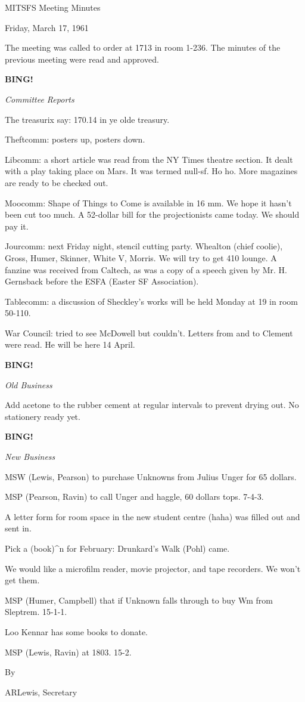 \documentclass[12pt]{article}
\newcommand{\bing}{{\bf BING!} }
\newcommand{\goto}[1]{\bing \vskip 12pt \centerline{{\em{#1}}}}
\begin{document}
\begin{center}

MITSFS Meeting Minutes

Friday, March 17, 1961

\end{center}
 
\vspace{12pt}

\setlength{\parskip}{6pt}

\noindent
The meeting was called to order at 1713 in room 1-236. The minutes of the previous meeting were read and approved.

\goto{Committee Reports}

The treasurix say: 170.14 in ye olde treasury.

Theftcomm: posters up, posters down.

Libcomm: a short article was read from the NY Times theatre section. It dealt with a play taking place on Mars. It was termed null-sf. Ho ho. More magazines are ready to be checked out.

Moocomm: Shape of Things to Come is available in 16 mm. We hope it hasn't been cut too much. A 52-dollar bill for the projectionists came today. We should pay it.

Jourcomm: next Friday night, stencil cutting party. Whealton (chief coolie), Gross, Humer, Skinner, White V, Morris. We will try to get 410 lounge. A fanzine was received from Caltech, as was a copy of a speech given by Mr. H. Gernsback before the ESFA (Easter SF Association).

Tablecomm: a discussion of Sheckley's works will be held Monday at 19 in room 50-110.

War Council: tried to see McDowell but couldn't. Letters from and to Clement were read. He will be here 14 April.

\goto{Old Business}

Add acetone to the rubber cement at regular intervals to prevent drying out. No stationery ready yet.

\goto{New Business}

MSW (Lewis, Pearson) to purchase Unknowns from Julius Unger for 65 dollars.

MSP (Pearson, Ravin) to call Unger and haggle, 60 dollars tops. 7-4-3.

A letter form for room space in the new student centre (haha) was filled out and sent in.

Pick a (book)^n for February: Drunkard's Walk (Pohl) came.

We would like a microfilm reader, movie projector, and tape recorders. We won't get them.

MSP (Humer, Campbell) that if Unknown falls through to buy Wm from Sleptrem. 15-1-1.

Loo Kennar has some books to donate.

MSP (Lewis, Ravin) at 1803. 15-2.

\vspace{12pt}

\centerline{By}
\centerline{ARLewis, Secretary}
\end{document}
